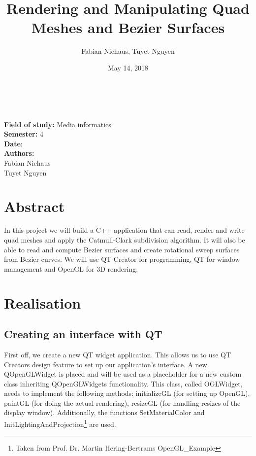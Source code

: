 \documentclass[12pt,a4paper]{scrartcl}
\title{Rendering and Manipulating Quad Meshes and Bezier Surfaces}
\author{Fabian Niehaus, Tuyet Nguyen}
\date{May 14, 2018}
\begin{document}
\begin{titlepage}
	\centering
	\ \\[2cm]
	{\huge\textbf{\@title}} 
	\\[3cm]
	\large
	\textbf{Field of study:} Media informatics \\
	\textbf{Semester:} 4
	\\[2cm]
	\textbf{Date}: \@date
	\\[2cm]
	\textbf {Authors:}
	\\Fabian Niehaus
	\\Tuyet Nguyen
\end{titlepage}

\newpage
\setcounter{page}{0}
\tableofcontents

\newpage
\ofoot[]{\pagemark}
\normalsize

\section{Abstract}
In this project we will build a C++ application that can read, render and write quad meshes and apply the Catmull-Clark subdivision algorithm. It will also be able to read and compute Bezier surfaces and create rotational sweep surfaces from Bezier curves. We will use QT Creator for programming, QT for window management and OpenGL for 3D rendering.

\section{Realisation}

\subsection{Creating an interface with QT}
First off, we create a new QT widget application. This allows us to use QT Creators design feature to set up our application's interface. A new QOpenGLWidget is placed and will be used as a placeholder for a new custom class inheriting QOpenGLWidgets functionality. This class, called OGLWidget, needs to implement the following methods: initializeGL (for setting up OpenGL), paintGL (for doing the actual rendering), resizeGL (for handling resizes of the display window). Additionally, the functions SetMaterialColor and InitLightingAndProjection\footnote{Taken from Prof. Dr. Martin Hering-Bertrams OpenGL_Example} are used.
\end{document}
